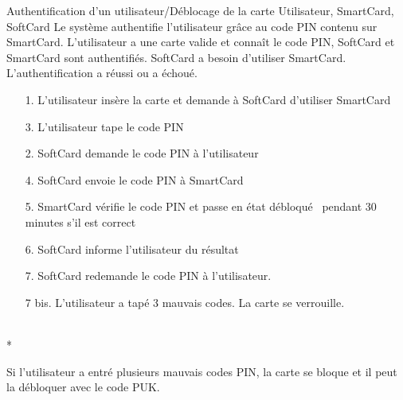 \documentclass[a4paper,11pt,french]{article}
\begin{document}
\fiche
    {Authentification d'un utilisateur/Déblocage de la carte}
	{Utilisateur, SmartCard, SoftCard}
	{Le système authentifie l'utilisateur grâce au code PIN contenu sur SmartCard.}
	{L'utilisateur a une carte valide et connaît le code PIN, SoftCard et SmartCard sont authentifiés.}
    {SoftCard a besoin d'utiliser SmartCard.}
    {L'authentification a réussi ou a échoué.}
    {\begin{itemize}
        \item[]
        \item[1.] L'utilisateur insère la carte et demande à SoftCard 
            d'utiliser SmartCard
        \item[3.] L'utilisateur tape le code PIN
    \end{itemize}
    }
	{\begin{itemize}
        \item[]
		\item[2.] SoftCard demande le code PIN à l'utilisateur
        \item[4.] SoftCard envoie le code PIN à SmartCard
        \item[5.] SmartCard vérifie le code PIN et passe en état 
            \og{}débloqué \fg{} pendant 30 minutes s'il est correct
        \item[6.] SoftCard informe l’utilisateur du résultat
	\end{itemize}
	}
	{}
\flots
{\begin{itemize}
        \item[]
        \item[7.] SoftCard redemande le code PIN à l'utilisateur.
\end{itemize}}
    {\begin{itemize}
    \item[]
    \item[7 bis.] L'utilisateur a tapé 3 mauvais codes. La carte se verrouille.
    \end{itemize}
    }
	{}    
\\*

Si l'utilisateur a entré plusieurs mauvais codes PIN, la carte se bloque et il 
peut la débloquer avec le code PUK.\\
\end{document}
